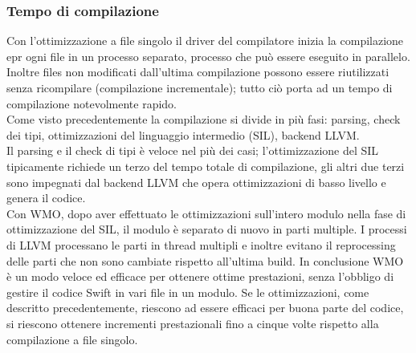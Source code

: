 \subsubsection{Tempo di compilazione}
Con l'ottimizzazione a file singolo il driver del compilatore inizia la compilazione epr ogni file in un processo separato, processo che può essere eseguito in parallelo. Inoltre files non modificati dall'ultima compilazione possono essere riutilizzati senza ricompilare (compilazione incrementale); tutto ciò porta ad un tempo di compilazione notevolmente rapido.\\
Come visto precedentemente la compilazione si divide in più fasi: parsing, check dei tipi, ottimizzazioni del linguaggio intermedio (SIL), backend LLVM.\\
Il parsing e il check di tipi è veloce nel più dei casi; l'ottimizzazione del SIL tipicamente richiede un terzo del tempo totale di compilazione, gli altri due terzi sono impegnati dal backend LLVM che opera ottimizzazioni di basso livello e genera il codice.\\
Con WMO, dopo aver effettuato le ottimizzazioni sull'intero modulo nella fase di ottimizzazione del SIL, il modulo è separato di nuovo in parti multiple. I processi di LLVM processano le parti in thread multipli e inoltre evitano il reprocessing delle parti che non sono cambiate rispetto all'ultima build.
In conclusione WMO è un modo veloce ed efficace per ottenere ottime prestazioni, senza l'obbligo di gestire il codice Swift in vari file in un modulo. Se le ottimizzazioni, come descritto precedentemente, riescono ad essere efficaci per buona parte del codice, si riescono ottenere incrementi prestazionali fino a cinque volte rispetto alla compilazione a file singolo. 
